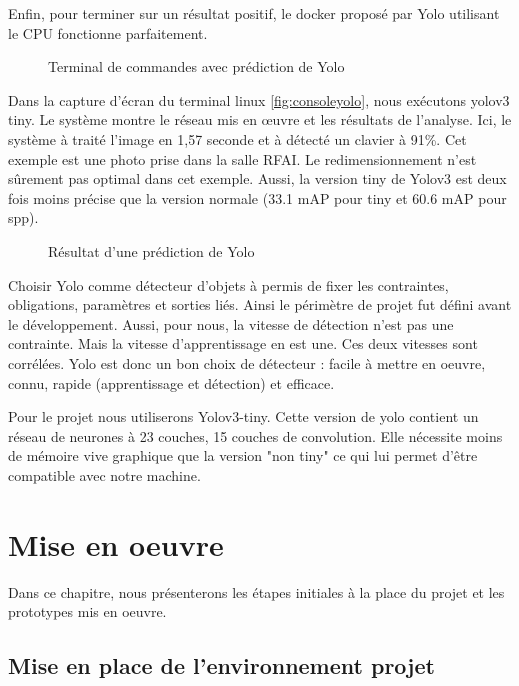 \documentclass[debug,nodate,hideweeklyreports]{polytech/polytech}
\begin{document}
Enfin, pour terminer sur un résultat positif, le docker proposé par Yolo utilisant le CPU fonctionne parfaitement. 
\begin{figure}
  \caption{Terminal de commandes avec prédiction de Yolo}
  \label{fig:consoleyolo}
\end{figure}
Dans la capture d’écran du terminal linux \autoref{fig:consoleyolo}, nous exécutons yolov3 tiny. Le système montre le réseau mis en œuvre et les résultats de l’analyse. Ici, le système à traité l’image en 1,57 seconde et à détecté un clavier à 91\%. Cet exemple est une photo prise dans la salle RFAI. Le redimensionnement n’est sûrement pas optimal dans cet exemple. Aussi, la version tiny de Yolov3 est deux fois moins précise que la version normale (33.1 mAP pour tiny et 60.6 mAP pour spp).

\begin{figure}
  \caption{Résultat d'une prédiction de Yolo}
  \label{fig:imgpredictyolo}
\end{figure}

Choisir Yolo comme détecteur d'objets à permis de fixer les contraintes, obligations, paramètres et sorties liés. Ainsi le périmètre de projet fut défini avant le développement.
Aussi, pour nous, la vitesse de détection n'est pas une contrainte. Mais la vitesse d'apprentissage en est une. Ces deux vitesses sont corrélées. Yolo est donc un bon choix de détecteur : facile à mettre en oeuvre, connu, rapide (apprentissage et détection) et efficace.

Pour le projet nous utiliserons Yolov3-tiny. Cette version de yolo contient un réseau de neurones à 23 couches, 15 couches de convolution. Elle nécessite moins de mémoire vive graphique que la version "non tiny" ce qui lui permet d'être compatible avec notre machine.

\chapter{Mise en oeuvre}

Dans ce chapitre, nous présenterons les étapes initiales à la place du projet et les prototypes mis en oeuvre.

\section{Mise en place de l'environnement projet}
\end{document}
